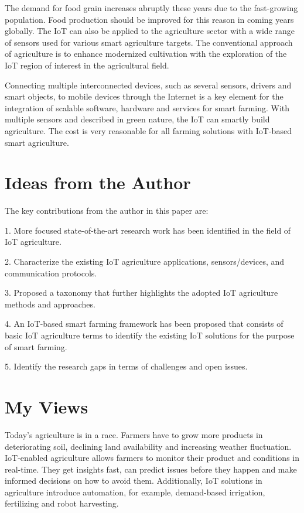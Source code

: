 \documentclass{article}
\begin{document}
The demand for food grain increases abruptly these years due to the fast-growing population. Food production should be improved for this reason in coming years globally. The IoT can also be applied to the agriculture sector with a wide range of sensors used for various smart agriculture targets. The conventional approach of agriculture is to enhance modernized cultivation with the exploration of the IoT region of interest in the agricultural field. 

Connecting multiple interconnected devices, such as several sensors, drivers and smart objects, to mobile devices through the Internet is a key element for the integration of scalable software, hardware and services for smart farming. With multiple sensors and described in green nature, the IoT can smartly build agriculture. The cost is very reasonable for all farming solutions with IoT-based smart agriculture.

\section{Ideas from the Author}
The key contributions from the author in this paper are:

1. More focused state-of-the-art research work has been identified in the field of IoT agriculture.

2. Characterize the existing IoT agriculture applications, sensors/devices, and communication protocols.

3. Proposed a taxonomy that further highlights the adopted IoT agriculture methods and approaches.

4. An IoT-based smart farming framework has been proposed that consists of basic IoT agriculture terms to identify the existing IoT solutions for the purpose of smart farming.

5. Identify the research gaps in terms of challenges and open issues.

\section{My Views}
Today’s agriculture is in a race. Farmers have to grow more products in deteriorating soil, declining land availability and increasing weather fluctuation. IoT-enabled agriculture allows farmers to monitor their product and conditions in real-time. They get insights fast, can predict issues before they happen and make informed decisions on how to avoid them. Additionally, IoT solutions in agriculture introduce automation, for example, demand-based irrigation, fertilizing and robot harvesting.
\end{document}
